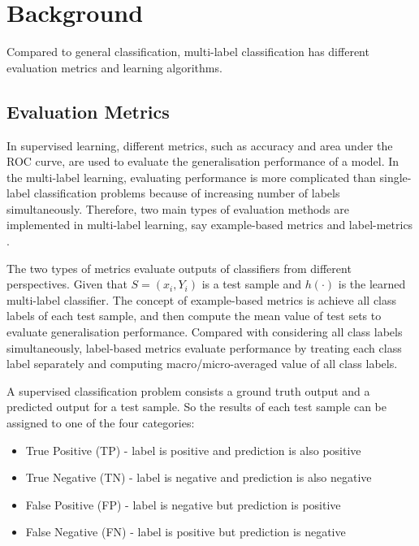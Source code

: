 
\chapter{Background} %
\label{Chapter6}

Compared to general classification, multi-label classification has different evaluation metrics and learning algorithms.

\section{Evaluation Metrics}

In supervised learning, different metrics, such as accuracy and area under the ROC curve, are used to evaluate the generalisation performance of a model. In the multi-label learning, evaluating performance is more complicated  than single-label classification problems because of increasing number of labels simultaneously. Therefore, two main types of evaluation methods are implemented in multi-label learning, say example-based metrics \citep{ghamrawi2005collective} and label-metrics \citep{tsoumakas2007random}.

The two types of metrics evaluate outputs of classifiers from different perspectives. Given that $S = {(x_{i}, Y_{i})}$ is a test sample and $h(\cdot)$ is the learned multi-label classifier. The concept of example-based metrics is achieve all class labels of each test sample, and then compute the mean value of test sets to evaluate generalisation performance. Compared with considering all class labels simultaneously, label-based metrics evaluate performance by treating each class label separately and computing macro/micro-averaged value of all class labels.

A supervised classification problem consists a ground truth output and a predicted output for a test sample. So the results of each test sample can be assigned to one of the four categories:
\begin{itemize}
\item True Positive (TP) - label is positive and prediction is also positive
\item True Negative (TN) - label is negative and prediction is also negative
\item False Positive (FP) - label is negative but prediction is positive
\item False Negative (FN) - label is positive but prediction is negative
\end{itemize}

